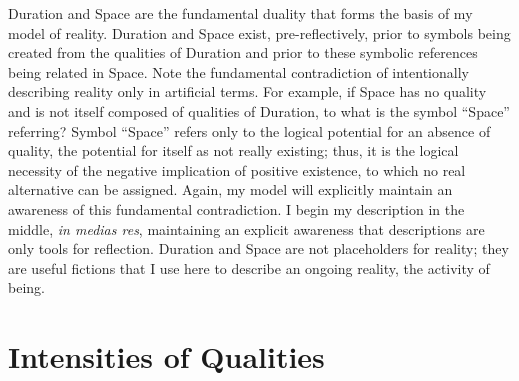 Duration and Space are the fundamental duality that forms the basis of
my model of reality.  Duration and Space exist, pre-reflectively,
prior to symbols being created from the qualities of Duration and
prior to these symbolic references being related in Space.  Note the
fundamental contradiction of intentionally describing reality only in
artificial terms.  For example, if Space has no quality and is not
itself composed of qualities of Duration, to what is the symbol
``Space'' referring?  Symbol ``Space'' refers only to the logical
potential for an absence of quality, the potential for itself as not
really existing; thus, it is the logical necessity of the negative
implication of positive existence, to which no real alternative can be
assigned.  Again, my model will explicitly maintain an awareness of
this fundamental contradiction.  I begin my description in the middle,
\emph{in medias res}, maintaining an explicit awareness that
descriptions are only tools for reflection.  Duration and Space are
not placeholders for reality; they are useful fictions that I use here
to describe an ongoing reality, the activity of being.

\section{Intensities of Qualities}
\label{section:intensities_of_qualities}


